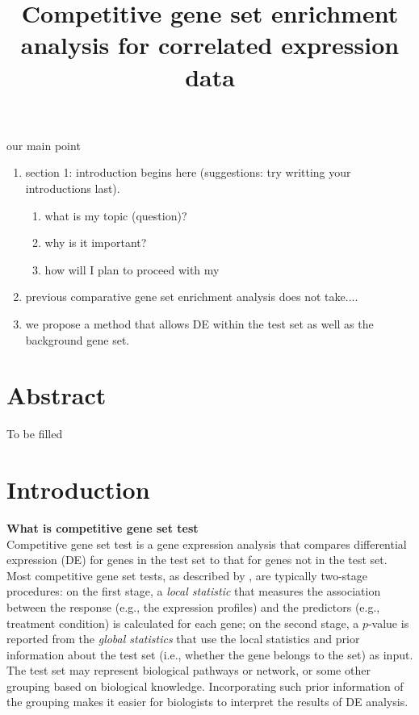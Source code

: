 \documentclass[11pt, a4paper]{article}
\title{Competitive gene set enrichment analysis for correlated expression data}
\date{} %
\begin{document}
	our main point
	\begin{enumerate}
		\item section 1:  introduction begins here (suggestions: try writting your introductions last).
		 \begin{enumerate}
		 	\item what is my topic (question)?
		 	\item why is it important?
		 	\item how will I plan to proceed with my
		 \end{enumerate}
		\item previous comparative gene set enrichment analysis does not take....
		\item we propose a method that allows DE within the test set as well as the background gene set.
	\end{enumerate}
	
	
	\newpage
	\maketitle
	
	\section*{Abstract}
	To be filled
	
	\section{Introduction}\label{section:introduction}
	\textbf{What is competitive gene set test}\\
	 Competitive gene set test \citep{goeman2007analyzing} is a gene expression analysis that compares differential expression (DE) for genes in the test set to that for genes not in the test set. Most competitive gene set tests, as described by \cite{barry2008statistical}, are typically two-stage procedures: on the first stage, a \textit{local statistic} that measures the association between the response (e.g., the expression profiles) and the predictors (e.g., treatment condition) is calculated for each gene; on the second stage, a $p$-value is reported from the \textit{global statistics} that use the local statistics and prior information about the test set (i.e., whether the gene belongs to the set) as input. The test set may represent biological pathways or network, or some other grouping based on biological knowledge. Incorporating such prior information of the grouping makes it easier for biologists to interpret the results of DE analysis.
	
\end{document}
